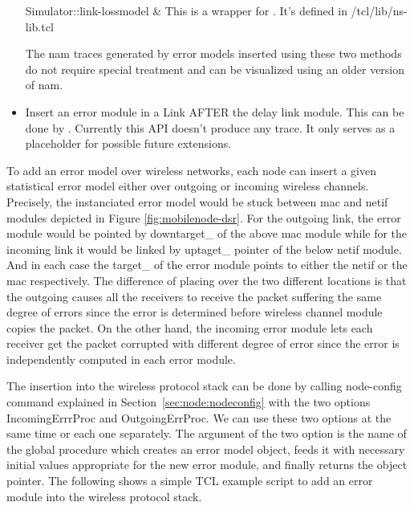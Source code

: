 \begin{itemize}
\begin{alist}
    Simulator::link-lossmodel    &
    This is a wrapper for . It's
    defined in \ns/tcl/lib/ns-lib.tcl 
  \end{alist}
  
  The nam traces generated by error models inserted using these two
  methods do not require special treatment and can be visualized using
  an older version of nam. 

\item Insert an error module in a Link AFTER the delay link module. 
  This can be done by . 
  Currently this API doesn't produce any trace. It only serves as a
  placeholder for possible future extensions. 
\end{itemize}

To add an error model over wireless networks, each node can insert 
a given statistical error model either over outgoing or incoming wireless channels.
Precisely, the instanciated error model would be stuck between mac and netif modules 
depicted in Figure \ref{fig:mobilenode-dsr}. For the outgoing link, the error module
would be pointed by downtarget\_ of the above mac module while for the incoming link 
it would be linked by uptaget\_ pointer of the below netif module. And in each case 
the target\_ of the error module points to either the netif or the mac respectively.  
The difference of placing over the two different locations is that the outgoing causes
all the receivers to receive the packet suffering the same degree of errors since the error is
determined before wireless channel module copies the packet. On the other
hand, the incoming error module lets each receiver get the packet corrupted with different
degree of error since the error is independently computed in each error module.

The insertion into the wireless protocol stack can be done by calling
node-config command explained in Section~\ref{sec:node:nodeconfig} with
the two options IncomingErrrProc and OutgoingErrProc. We can use these two options 
at the same time or each one separately.  The argument of the two option is the
name of the global procedure which creates an error model object,
feeds it with necessary initial values appropriate for the new error
module, and finally returns the object pointer. The following shows a
simple TCL example script to add an error module into the wireless
protocol stack.

